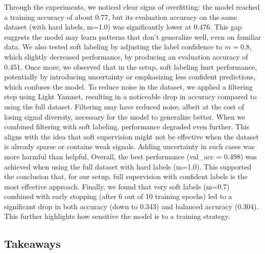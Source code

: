 \documentclass[11pt]{article}
\begin{document}
Through the experiments, we noticed clear signs of overfitting: the model reached a training accuracy of about 0.77, but its evaluation accuracy on the same dataset (with hard labels, m=1.0) was significantly lower at 0.476. This gap suggests the model may learn patterns that don't generalize well, even on familiar data. We also tested soft labeling by adjusting the label confidence to $m=0.8$, which slightly decreased performance, by producing an evaluation accuracy of 0.451. Once more, we observed that in the setup, soft labeling hurt performance, potentially by introducing uncertainty or emphasizing less confident predictions, which confuses the model. To reduce noise in the dataset, we applied a filtering step using Light Yamnet, resulting in a noticeable drop in accuracy compared to using the full dataset. Filtering may have reduced noise, albeit at the cost of losing signal diversity, necessary for the model to generalize better. When we combined filtering with soft labeling, performance degraded even further. This aligns with the idea that soft supervision might not be effective when the dataset is already sparse or contains weak signals. Adding uncertainty in such cases was more harmful than helpful. Overall, the best performance (val\_acc = 0.498) was achieved when using the full dataset with hard labels (m=1.0). This supported the conclusion that, for our setup, full supervision with confident labels is the most effective approach. Finally, we found that very soft labels (m=0.7) combined with early stopping (after 6 out of 10 training epochs) led to a significant drop in both accuracy (down to 0.343) and balanced accuracy (0.304). This further highlights how sensitive the model is to a training strategy.

\subsection*{Takeaways}
\end{document}
